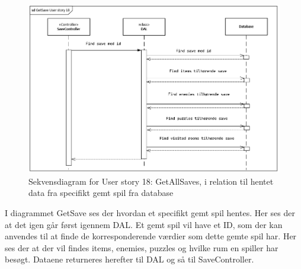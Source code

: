 \begin{figure}[H]
\centering
\includegraphics[width = \textwidth]{02-Body/Images/GetSaveDB.PNG}
\caption{Sekvensdiagram for User story 18: GetAllSaves, i relation til hentet data fra specifikt gemt spil fra database}
\label{fig:GetSaveDB}
\end{figure}

I diagrammet GetSave ses der hvordan et specifikt gemt spil hentes. Her ses der at det igen går først igennem DAL. Et gemt spil vil have et ID, som der kan anvendes til at finde de korresponderende værdier som dette gemte spil har. Her ses der at der vil findes items, enemies, puzzles og hvilke rum en spiller har besøgt. Dataene returneres herefter til DAL og så til SaveController.

